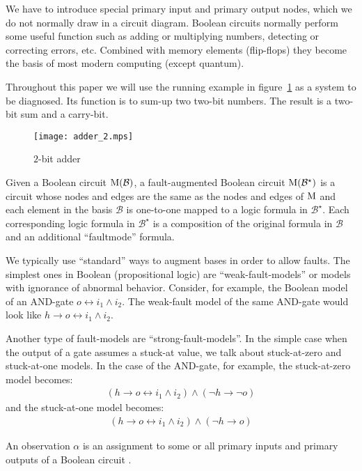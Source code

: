 \documentclass{article}
\begin{document}
%
We have to introduce special primary input and primary output nodes,
which we do not normally draw in a circuit diagram. Boolean circuits
normally perform some useful function such as adding or multiplying
numbers, detecting or correcting errors, etc. Combined with memory
elements (flip-flops) they become the basis of most modern computing
(except quantum).
\par
Throughout this paper we will use the running example in
figure~\ref{fig:adder} as a system to be diagnosed. Its function is to
sum-up two two-bit numbers. The result is a two-bit sum and a
carry-bit.
%
\begin{figure}[htb]
\centering
\texttt{[image: adder\_2.mps]}
\caption{$2$-bit adder\label{fig:adder}}
\end{figure}
%
\begin{definition}
  Given a Boolean circuit $\mathrm{M}(\mathcal{B})$, a fault-augmented
  Boolean circuit $\mathrm{M}(\mathcal{B^\star})$ is a circuit whose nodes
  and edges are the same as the nodes and edges of $\mathrm{M}$ and each
  element in the basis $\mathcal{B}$ is one-to-one mapped to a logic
  formula in $\mathcal{B^\star}$. Each corresponding logic formula in
  $\mathcal{B^\star}$ is a composition of the original formula in
  $\mathcal{B}$ and an additional ``faultmode'' formula.
\end{definition}
%
We typically use ``standard'' ways to augment bases in order to allow
faults. The simplest ones in Boolean (propositional logic) are
``weak-fault-models'' or models with ignorance of abnormal
behavior. Consider, for example, the Boolean model of an AND-gate $o
\leftrightarrow i_1 \wedge i_2$. The weak-fault model of the same
AND-gate would look like $h \rightarrow o \leftrightarrow i_1 \wedge
i_2$.
\par
Another type of fault-models are ``strong-fault-models''. In the
simple case when the output of a gate assumes a stuck-at value, we
talk about stuck-at-zero and stuck-at-one models. In the case of the
AND-gate, for example, the stuck-at-zero model becomes:
%
\begin{eqnarray}
  (h \rightarrow o \leftrightarrow i_1 \wedge i_2) \wedge (\neg{h} \rightarrow \neg{o})
\end{eqnarray}
%
and the stuck-at-one model becomes:
%
\begin{eqnarray}
  (h \rightarrow o \leftrightarrow i_1 \wedge i_2) \wedge (\neg{h} \rightarrow o)
\end{eqnarray}
%
\begin{definition}[Observation]
  An observation $\alpha$ is an assignment to some or all primary
  inputs and primary outputs of a Boolean circuit \model.
\end{definition}
\end{document}
